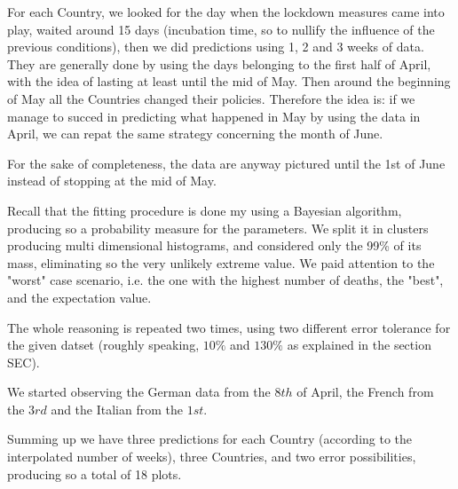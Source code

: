 \documentclass[8pt]{article}
\begin{document}
For each Country, we looked for the day when the lockdown measures
came into play, waited around 15 days (incubation time, so to nullify
the influence of the previous conditions), then we did predictions 
using 1, 2 and 3 weeks of data. They are generally done by using 
the days belonging to the first half of April, with the idea of lasting
at least until the mid of May. 
Then around the beginning of May all the Countries changed their
policies. Therefore the idea is: if we manage to succed in predicting
what happened in May by using the data in April, we can repat the same
strategy concerning the month of June. 


For the sake of completeness, the 
data are anyway pictured until the 1st of June instead of stopping at
the mid of May.


Recall that the fitting procedure is done my using a Bayesian algorithm,
producing so a probability measure for the parameters. We split it in
clusters producing multi dimensional histograms, and considered
only the 99\% of its mass, eliminating so the very
unlikely extreme value. We paid attention to
the "worst" case scenario, i.e. the one with the highest number of deaths, 
the "best", and the expectation value.


The whole reasoning is repeated two times, using two different error
tolerance for the given datset (roughly speaking, $10\%$ and $130\%$
as explained in the section SEC).


We started observing the German data from the $8th$ of April,
the French from the $3rd$ and the Italian from the $1st$. 


Summing up we have three predictions for each Country (according to the
interpolated number of weeks), three Countries, and two error
possibilities, producing so a total of 18 plots.
\end{document}
